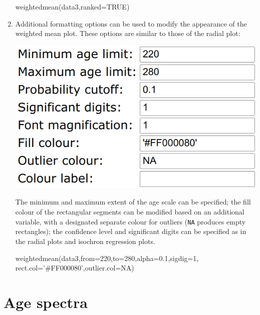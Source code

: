\begin{refsection}
\begin{enumerate}
\begin{console}
weightedmean(data3,ranked=TRUE)
\end{console}

\item Additional formatting options can be used to modify the
  appearance of the weighted mean plot. These options are similar to
  those of the radial plot:

\noindent\begin{minipage}[t]{.42\linewidth}
\strut\vspace*{-\baselineskip}\newline
  \includegraphics[width=\linewidth]{../figures/OtherWtdMeanRemainingOptions.png}
\end{minipage}
\begin{minipage}[t]{.58\linewidth}
  The minimum and maximum extent of the age scale can be specified;
  the fill colour of the rectangular segments can be modified based on
  an additional variable, with a designated separate colour for
  outliers (\texttt{NA} produces empty rectangles); the confidence
  level and significant digits can be specified as in the radial plots
  and isochron regression plots.
\end{minipage}

\begin{script}
weightedmean(data3,from=220,to=280,alpha=0.1,sigdig=1,
             rect.col='#FF000080',outlier.col=NA)
\end{script}

\end{enumerate}
 
\section{Age spectra}\label{sec:OtherAgeSpectra}


\end{refsection}
